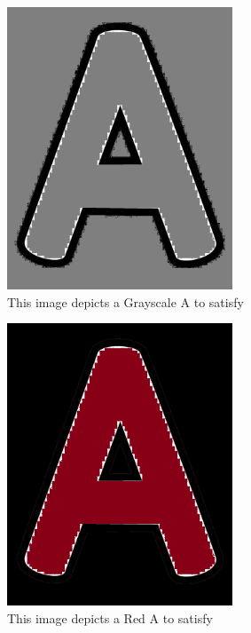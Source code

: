 \documentclass[12pt, titlepage]{article}
\begin{document}
\begin{figure}[h!]
  \begin{center}
    \includegraphics[width=0.6\textwidth]{A_Gray}
  \caption{This image depicts a Grayscale A to satisfy}
  \label{Fig_grayA} 
  \end{center}
  \end{figure}

\begin{figure}[h!]
  \begin{center}
    \includegraphics[width=0.6\textwidth]{A_Red}
  \caption{This image depicts a Red A to satisfy}
  \label{Fig_redA} 
  \end{center}
  \end{figure}
\end{document}
